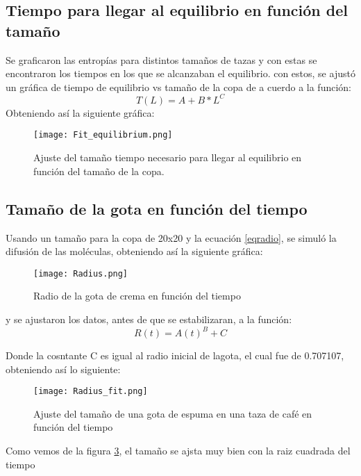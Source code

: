 \documentclass{article}
\begin{document}
\subsection{Tiempo para llegar al equilibrio en función del tamaño}
Se graficaron las entropías para distintos tamaños de tazas y con estas se encontraron los tiempos en los que se alcanzaban el equilibrio. con estos, se ajustó un gráfica de tiempo de equilibrio vs tamaño de la copa de a cuerdo a la función:
\begin{equation}
    T(L)=A+B*L^{C}
\end{equation}
Obteniendo así la siguiente gráfica:
\begin{figure}[H]
   \centering
   \texttt{[image: Fit\_equilibrium.png]}
   \caption{Ajuste del tamaño tiempo necesario para llegar al equilibrio en función del tamaño de la copa.}
   \label{fig:eqtime}
 \end{figure}
 



\subsection{Tamaño de la gota en función del tiempo}
Usando un tamaño para la copa de 20x20 y la ecuación \ref{eqradio}, se simuló la difusión de las moléculas, obteniendo así la siguiente gráfica:
\begin{figure}[H]
   \centering
   \texttt{[image: Radius.png]}
   \caption{Radio de la gota de crema en función del tiempo}
   \label{fig:radius}
 \end{figure}

y se ajustaron los datos, antes de que se estabilizaran, a la función:
\begin{equation}
    R(t)=A(t)^{B}+C
\end{equation}

Donde la cosntante C es igual al radio inicial de lagota, el cual fue de 0.707107, obteniendo así lo siguiente:
\begin{figure}[H]
   \centering
   \texttt{[image: Radius\_fit.png]}
   \caption{Ajuste del tamaño de una gota de espuma en una taza de café en función del tiempo}
   \label{fig:radius}
 \end{figure}
  Como vemos de la figura \ref{fig:radius}, el tamaño se ajsta muy bien con la raiz cuadrada del tiempo
    
  
\end{document}
